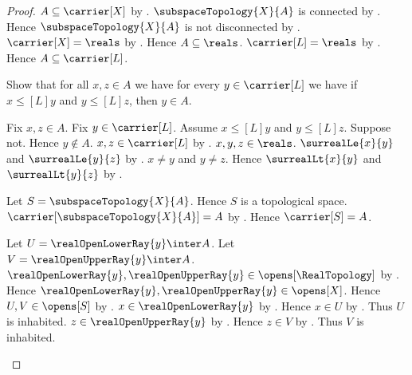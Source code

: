 \begin{proof}
    $A\subseteq\carrier[X]$ by
        .
    $\subspaceTopology{X}{A}$ is connected by
        .
    Hence $\subspaceTopology{X}{A}$ is not disconnected by
        .
    $\carrier[X]=\reals$ by .
    Hence $A\subseteq\reals$.
    $\carrier[L]=\reals$ by
        .
    Hence $A\subseteq\carrier[L]$.

    Show that for all $x,z\in A$ we have
        for every $y\in\carrier[L]$ we have if
            $x\mathrel{\leq[L]}y$ and $y\mathrel{\leq[L]}z$, then
            $y\in A$.
    \begin{subproof}
        Fix $x,z\in A$.
        Fix $y\in\carrier[L]$.
        Assume $x\mathrel{\leq[L]}y$ and
            $y\mathrel{\leq[L]}z$.
        Suppose not.
        Hence $y\notin A$.
        $x,z\in\carrier[L]$ by .
        $x,y,z\in\reals$.
        $\surrealLe{x}{y}$ and $\surrealLe{y}{z}$ by
            .
        $x\neq y$ and $y\neq z$.
        Hence $\surrealLt{x}{y}$ and $\surrealLt{y}{z}$ by
            .

        Let $S=\subspaceTopology{X}{A}$.
        Hence $S$ is a topological space.
        $\carrier[\subspaceTopology{X}{A}]=A$ by
            .
        Hence $\carrier[S]=A$.

        Let $U=\realOpenLowerRay{y}\inter A$.
        Let $V=\realOpenUpperRay{y}\inter A$.
        $\realOpenLowerRay{y},\realOpenUpperRay{y}
            \in\opens[\RealTopology]$ by
            .
        Hence $\realOpenLowerRay{y},\realOpenUpperRay{y}
            \in\opens[X]$.
        Hence $U,V\in\opens[S]$ by
            .
        $x\in\realOpenLowerRay{y}$ by
            .
        Hence $x\in U$ by .
        Thus $U$ is inhabited.
        $z\in\realOpenUpperRay{y}$ by
            .
        Hence $z\in V$ by .
        Thus $V$ is inhabited.


\end{subproof}
\end{proof}
